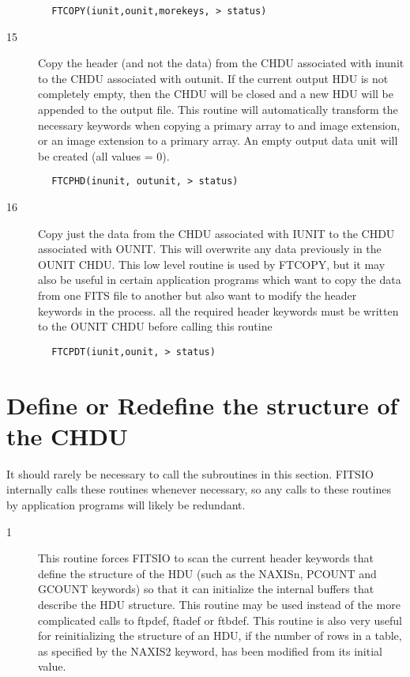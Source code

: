 \documentclass[11pt]{book}
\begin{document}
\begin{verbatim}
        FTCOPY(iunit,ounit,morekeys, > status)
\end{verbatim}

\begin{description}
\item[15] Copy the header (and not the data) from the CHDU associated with inunit
    to the CHDU associated with outunit.  If the current output HDU
    is not completely empty, then the CHDU will be closed and a new
    HDU will be appended to the output file.  This routine will automatically
    transform the necessary keywords when copying a primary array to
    and image extension, or an image extension to a primary array.
   An empty output data unit will be created (all values = 0).
\end{description}

\begin{verbatim}
        FTCPHD(inunit, outunit, > status)
\end{verbatim}

\begin{description}
\item[16] Copy just the data from the CHDU associated with IUNIT
    to the CHDU associated with OUNIT. This will overwrite
    any data previously in the OUNIT CHDU.  This low level routine is used
    by FTCOPY, but it may also be useful in certain application programs
    which want to copy the data from one FITS file to another but also
    want to modify the header keywords in the process. all the required
    header keywords must be written to the OUNIT CHDU before calling
   this routine
\end{description}

\begin{verbatim}
        FTCPDT(iunit,ounit, > status)
\end{verbatim}


\section{Define or Redefine the structure of the CHDU \label{FTRDEF}}

It should rarely be necessary to call the subroutines in this section.
FITSIO internally calls these routines whenever necessary, so any calls
to these routines by application programs will likely be redundant.


\begin{description}
\item[1 ] This routine forces FITSIO to scan the current header keywords that
    define the structure of the HDU (such as the NAXISn, PCOUNT and GCOUNT
    keywords) so that it can initialize the internal buffers that describe
    the HDU structure.  This routine may be used instead of the more
    complicated calls to ftpdef, ftadef or ftbdef.  This routine is
    also very useful for reinitializing the structure of an HDU,
    if the number of rows in a table, as specified by the NAXIS2 keyword,
   has been modified from its initial value.
\end{description}
\end{document}
